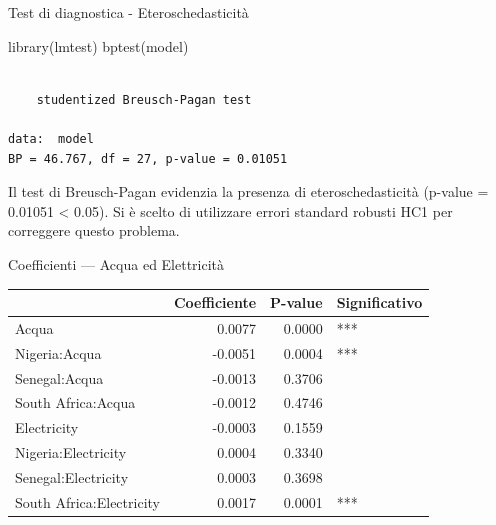 \documentclass[
  ignorenonframetext,
  aspectratio=43,
]{beamer}
\newenvironment{Shaded}{\begin{snugshade}}{\end{snugshade}}
\newcommand{\FunctionTok}[1]{\textcolor[rgb]{0.28,0.35,0.67}{#1}}
\newcommand{\NormalTok}[1]{\textcolor[rgb]{0.00,0.23,0.31}{#1}}
\begin{document}
\begin{frame}[fragile]{Test di diagnostica - Eteroschedasticità}
\label{test-di-diagnostica---eteroschedasticituxe0}
\begin{Shaded}
\begin{Highlighting}[]
\FunctionTok{library}\NormalTok{(lmtest)}
\FunctionTok{bptest}\NormalTok{(model)}
\end{Highlighting}
\end{Shaded}

\begin{verbatim}

    studentized Breusch-Pagan test

data:  model
BP = 46.767, df = 27, p-value = 0.01051
\end{verbatim}

Il test di Breusch-Pagan evidenzia la presenza di eteroschedasticità
(p-value = 0.01051 \textless{} 0.05). Si è scelto di utilizzare errori
standard robusti HC1 per correggere questo problema.
\end{frame}

\begin{frame}{Coefficienti --- Acqua ed Elettricità}
\label{coefficienti-acqua-ed-elettricituxe0}
\begin{tabular}{lrrl}
\toprule
  & Coefficiente & P-value & Significativo\\
\midrule
Acqua & 0.0077 & 0.0000 & ***\\
Nigeria:Acqua & -0.0051 & 0.0004 & ***\\
Senegal:Acqua & -0.0013 & 0.3706 & \\
South Africa:Acqua & -0.0012 & 0.4746 & \\
Electricity & -0.0003 & 0.1559 & \\
\addlinespace
Nigeria:Electricity & 0.0004 & 0.3340 & \\
Senegal:Electricity & 0.0003 & 0.3698 & \\
South Africa:Electricity & 0.0017 & 0.0001 & ***\\
\bottomrule
\end{tabular}
\end{frame}
\end{document}
